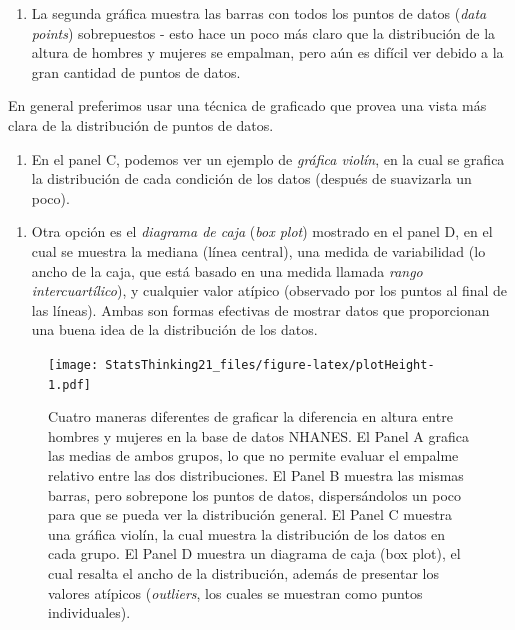 \documentclass[
  12pt,
]{book}
\providecommand{\tightlist}{%
  \setlength{\itemsep}{0pt}\setlength{\parskip}{0pt}}
\begin{document}
\begin{enumerate}
\def\labelenumi{\arabic{enumi}.}
\setcounter{enumi}{1}
\tightlist
\item
  La segunda gráfica muestra las barras con todos los puntos de datos (\emph{data points}) sobrepuestos - esto hace un poco más claro que la distribución de la altura de hombres y mujeres se empalman, pero aún es difícil ver debido a la gran cantidad de puntos de datos.
\end{enumerate}

En general preferimos usar una técnica de graficado que provea una vista más clara de la distribución de puntos de datos.

\begin{enumerate}
\def\labelenumi{\arabic{enumi}.}
\setcounter{enumi}{2}
\tightlist
\item
  En el panel C, podemos ver un ejemplo de \emph{gráfica violín}, en la cual se grafica la distribución de cada condición de los datos (después de suavizarla un poco).
\end{enumerate}

\begin{enumerate}
\def\labelenumi{\arabic{enumi}.}
\setcounter{enumi}{3}
\tightlist
\item
  Otra opción es el \emph{diagrama de caja} (\emph{box plot}) mostrado en el panel D, en el cual se muestra la mediana (línea central), una medida de variabilidad (lo ancho de la caja, que está basado en una medida llamada \emph{rango intercuartílico}), y cualquier valor atípico (observado por los puntos al final de las líneas). Ambas son formas efectivas de mostrar datos que proporcionan una buena idea de la distribución de los datos.
\end{enumerate}

\begin{figure}
\centering
\texttt{[image: StatsThinking21\_files/figure-latex/plotHeight-1.pdf]}
\caption{\label{fig:plotHeight}Cuatro maneras diferentes de graficar la diferencia en altura entre hombres y mujeres en la base de datos NHANES. El Panel A grafica las medias de ambos grupos, lo que no permite evaluar el empalme relativo entre las dos distribuciones. El Panel B muestra las mismas barras, pero sobrepone los puntos de datos, dispersándolos un poco para que se pueda ver la distribución general. El Panel C muestra una gráfica violín, la cual muestra la distribución de los datos en cada grupo. El Panel D muestra un diagrama de caja (box plot), el cual resalta el ancho de la distribución, además de presentar los valores atípicos (\emph{outliers}, los cuales se muestran como puntos individuales).}
\end{figure}
\end{document}
